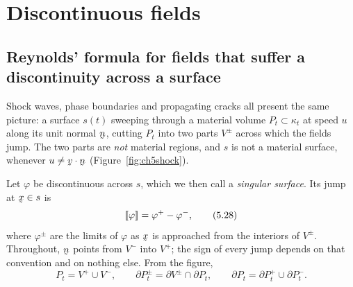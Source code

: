 \section{Discontinuous fields}\label{sec:ch5disc}

\subsection{Reynolds' formula for fields that suffer a discontinuity
across a surface}\label{sec:reydisc}

Shock waves, phase boundaries and propagating cracks all present the same
picture: a surface $s(t)$ sweeping through a material volume
$P_{t}\subset\kappa_{t}$ at speed $u$ along its unit normal $\bn$, cutting
$P_{t}$ into two parts $V^{\pm}$ across which the fields jump. The two
parts are \emph{not} material regions, and $s$ is not a material surface,
whenever $u\neq\ip\bv\bn$ (Figure~\ref{fig:ch5shock}).

Let $\varphi$ be discontinuous across $s$, which we then call a
\emph{singular surface}. Its jump at $\bx\in s$ is
\begin{equation}
   [\![\varphi]\!]=\varphi^{+}-\varphi^{-},
   \tag{5.28}\label{eq:5.28}
\end{equation}
where $\varphi^{\pm}$ are the limits of $\varphi$ as $\bx$ is approached
from the interiors of $V^{\pm}$. Throughout, $\bn$ points from $V^{-}$
into $V^{+}$; the sign of every jump depends on that convention and on
nothing else. From the figure,
\begin{equation}
   P_{t}=V^{+}\cup V^{-},\qquad
   \partial P_{t}^{\pm}=\partial V^{\pm}\cap\partial P_{t},\qquad
   \partial P_{t}=\partial P_{t}^{+}\cup\partial P_{t}^{-}.
   \tag{5.29}\label{eq:5.29}
\end{equation}

